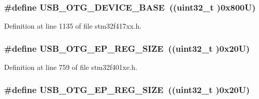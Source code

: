 \subsubsection[{\texorpdfstring{U\+S\+B\+\_\+\+O\+T\+G\+\_\+\+D\+E\+V\+I\+C\+E\+\_\+\+B\+A\+SE}{USB_OTG_DEVICE_BASE}}]{\setlength{\rightskip}{0pt plus 5cm}\#define U\+S\+B\+\_\+\+O\+T\+G\+\_\+\+D\+E\+V\+I\+C\+E\+\_\+\+B\+A\+SE~((uint32\+\_\+t )0x800\+U)}\hypertarget{group___peripheral__registers__structures_ga4d74a337597a77b1fca978202b519a18}{}\label{group___peripheral__registers__structures_ga4d74a337597a77b1fca978202b519a18}


Definition at line 1135 of file stm32f417xx.\+h.

\subsubsection[{\texorpdfstring{U\+S\+B\+\_\+\+O\+T\+G\+\_\+\+E\+P\+\_\+\+R\+E\+G\+\_\+\+S\+I\+ZE}{USB_OTG_EP_REG_SIZE}}]{\setlength{\rightskip}{0pt plus 5cm}\#define U\+S\+B\+\_\+\+O\+T\+G\+\_\+\+E\+P\+\_\+\+R\+E\+G\+\_\+\+S\+I\+ZE~((uint32\+\_\+t )0x20\+U)}\hypertarget{group___peripheral__registers__structures_ga6fdb7429ad88e2d69440d6ecc4f4199e}{}\label{group___peripheral__registers__structures_ga6fdb7429ad88e2d69440d6ecc4f4199e}


Definition at line 759 of file stm32f401xe.\+h.

\subsubsection[{\texorpdfstring{U\+S\+B\+\_\+\+O\+T\+G\+\_\+\+E\+P\+\_\+\+R\+E\+G\+\_\+\+S\+I\+ZE}{USB_OTG_EP_REG_SIZE}}]{\setlength{\rightskip}{0pt plus 5cm}\#define U\+S\+B\+\_\+\+O\+T\+G\+\_\+\+E\+P\+\_\+\+R\+E\+G\+\_\+\+S\+I\+ZE~((uint32\+\_\+t )0x20\+U)}\hypertarget{group___peripheral__registers__structures_ga6fdb7429ad88e2d69440d6ecc4f4199e}{}\label{group___peripheral__registers__structures_ga6fdb7429ad88e2d69440d6ecc4f4199e}



